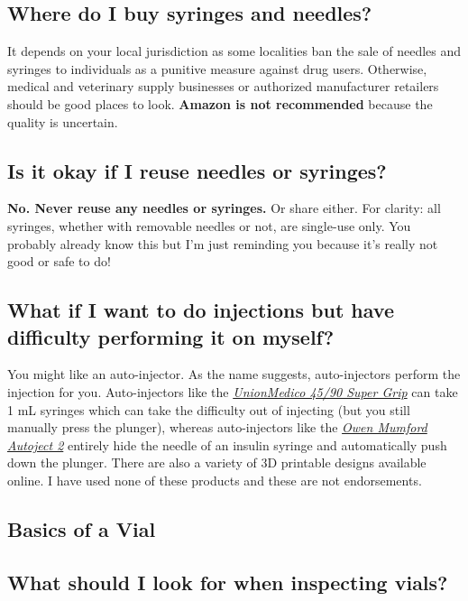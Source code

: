 \documentclass{article}
\begin{document}
\subsection{Where do I buy syringes and needles?}

It depends on your local jurisdiction as some localities ban the sale of needles and syringes to individuals as a punitive measure against drug users. Otherwise, medical and veterinary supply businesses or authorized manufacturer retailers should be good places to look. \textbf{Amazon is not recommended} because the quality is uncertain.

\subsection{Is it okay if I reuse needles or syringes?}

\textbf{No. Never reuse any needles or syringes.} Or share either. For clarity: all syringes, whether with removable needles or not, are single-use only. You probably already know this but I’m just reminding you because it’s really not good or safe to do!

\subsection{What if I want to do injections but have difficulty performing it on myself?}\label{5-21}

You might like an auto-injector. As the name suggests, auto-injectors perform the injection for you. Auto-injectors like the \href{https://unionmedico.com/90-super-grip/}{\textit{UnionMedico 45/90 Super Grip}} can take 1 mL syringes which can take the difficulty out of injecting (but you still manually press the plunger), whereas auto-injectors like the \href{https://www.youtube.com/watch?v=hPbhEpUN43Y}{\textit{Owen Mumford Autoject 2}} entirely hide the needle of an insulin syringe and automatically push down the plunger. There are also a variety of 3D printable designs available online. I have used none of these products and these are not endorsements.

\subsection*{Basics of a Vial}

\subsection{What should I look for when inspecting vials?}
\end{document}
